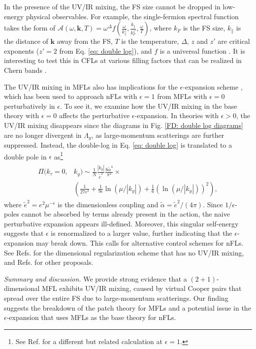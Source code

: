 \documentclass[prl,amsmath,amssymb, notitlepage, twocolumn,
nofootinbib,
superscriptaddress,
longbibliography
]{revtex4-1}
\newcommand{\mc}[1]{\mathcal{#1}}
\newcommand{\beq}{\begin{eqnarray}}
\newcommand{\eeq}{\end{eqnarray}}
\renewcommand{\vec}[1]{\bm{#1}}
\begin{document}
{In the presence of the UV/IR mixing, the FS size cannot be dropped in low-energy physical observables.
For example,
the single-fermion spectral function takes the form of
$\mc{A}(\omega, \vec k, T)
=
\omega^\Delta f\left(\frac{\omega}{k^z_\parallel},  \frac{k_\parallel}{k_F^{z'}}, \frac{\omega}{T}\right)$, 
where $k_F$ is the FS size, $k_{\parallel}$ is the distance of $\vec k$ away from the FS, $T$ is the temperature, $\Delta$, $z$ and $z'$ are critical exponents ($z'=2$ from Eq. \eqref{eq: double log}), and $f$ is a universal function  \cite{Mandal2015}.
It is interesting to test this in CFLs at various filling factors that can be realized in Chern bands \cite{Zou2020a}. 

The UV/IR mixing in MFLs also has implications for the $\epsilon$-expansion  scheme \cite{Nayak1994,Mross2010}, which has been used to approach nFLs 
with $\epsilon =1$ from MFLs with $\epsilon=0$ perturbatively in $\epsilon$.
To see it, we examine
how the UV/IR mixing in the base theory 
with $\epsilon=0$ affects the perturbative $\epsilon$-expansion.
In theories with $\epsilon > 0$, the UV/IR mixing disappears since the diagrams
in Fig. \ref{FD: double log diagrams}
are no longer divergent in $\Lambda_y$, as large-momentum scatterings are  further suppressed.
Instead, the double-log  
in Eq. \eqref{eq: double log}
is translated to a double pole in $\epsilon$ as{\footnote{See Ref. \cite{Holder2015} for a different but related calculation at $\epsilon=1$.}}
\beq\label{eq: double log epsilon}
\begin{split}
\Pi(k_\tau=0, &k_y)\sim \frac{1}{N}\frac{|k_y|}{\tilde e^2}\frac{8\tilde\alpha^4}{\pi^2}\times\\
&\left( \frac{1}{27\epsilon^2}+\frac{1}{9\epsilon}\ln(\mu/|k_y|)+\frac{1}{6}\left(\ln(\mu/|k_y|)\right)^2\right),
\end{split}
\eeq
where
$\tilde e^2 = e^2\mu^{-\epsilon}$ is  the dimensionless coupling and $\tilde\alpha=\tilde e^2/(4\pi)$. 
Since $1/\epsilon$-poles cannot be absorbed by terms already present in the action,
the naive perturbative expansion appears ill-defined. Moreover, this singular self-energy suggests that $\epsilon$ is renormalized to a larger value, further indicating that the $\epsilon$-expansion may break down.
This calls for alternative control schemes for nFLs.
See  Refs. \cite{Dalidovich2013,
Sur2014,
Lunts2017}
for the dimensional regularization scheme that has no UV/IR mixing,
and Refs. \cite{Damia2019, Aldape2020, Kim2020, Esterlis2021}
for other proposals.


{\it Summary and discussion.} 
We provide strong evidence that a $(2+1)$-dimensional MFL exhibits UV/IR mixing, caused by virtual Cooper pairs that spread over the entire FS due to large-momentum scatterings.
Our finding suggests the breakdown of the patch theory for MFLs
and a potential issue
in the $\epsilon$-expansion that uses MFLs as the base theory for nFLs.

}
\end{document}
